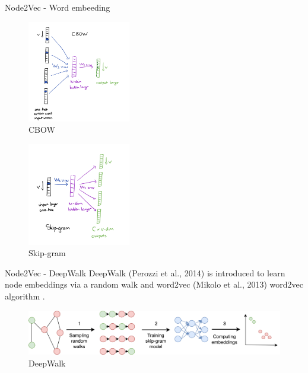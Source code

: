 \begin{frame}{Node2Vec - Word embeeding}
    \begin{multicols}{2}
        \begin{figure}[htp]
            \centering
            \includegraphics[width=0.4\textwidth]{topics/201010-zhang2019comprehensive/assets/img/cbow.png}
            \caption{CBOW}
        \end{figure}

        \begin{figure}[htp]
            \centering
            \includegraphics[width=0.4\textwidth]{topics/201010-zhang2019comprehensive/assets/img/skip-gram.png}
            \caption{Skip-gram}
        \end{figure}
    \end{multicols}
\end{frame}

\begin{frame}{Node2Vec - DeepWalk}
    DeepWalk (Perozzi et al., 2014) is introduced to learn node embeddings via a random walk and word2vec (Mikolo et al., 2013) word2vec algorithm \cite{perozzi2014deepwalk} \cite{mikolov2013distributed}.
    \begin{figure}[htp]
        \centering
        \includegraphics[width=\textwidth]{topics/201010-zhang2019comprehensive/assets/img/deepwalk.png}
        \caption{DeepWalk}
    \end{figure}
\end{frame}

